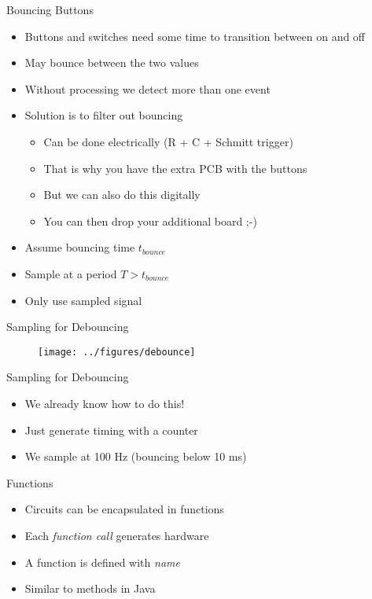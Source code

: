\begin{frame}[fragile]{Bouncing Buttons}
\begin{itemize}
\item Buttons and switches need some time to transition between on and off
\item May bounce between the two values
\item Without processing we detect more than one event
\item Solution is to filter out bouncing
\begin{itemize}
\item Can be done electrically (R + C + Schmitt trigger)
\item That is why you have the extra PCB with the buttons
\item But we can also do this digitally
\item You can then drop your additional board ;-)
\end{itemize}
\item Assume  bouncing time $t_{bounce}$
\item Sample at a period $T > t_{bounce}$
\item Only use sampled signal
\end{itemize}
\end{frame}


\begin{frame}[fragile]{Sampling for Debouncing}
\begin{figure}
  \texttt{[image: ../figures/debounce]}
\end{figure}
\end{frame}


\begin{frame}[fragile]{Sampling for Debouncing}
\begin{itemize}
\item We already know how to do this!
\item Just generate timing with a counter
\item We sample at 100 Hz (bouncing below 10 ms)
\end{itemize}
\end{frame}


\begin{frame}[fragile]{Functions}
\begin{itemize}
\item Circuits can be encapsulated in functions
\item Each \emph{function call} generates hardware
\item A function is defined with  \emph{name}
\item Similar to methods in Java
\end{itemize}
\end{frame}

